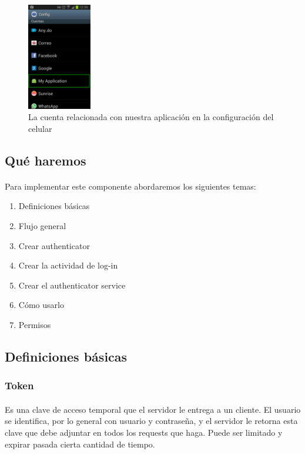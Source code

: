 \documentclass[10pt]{extarticle}
\begin{document}
\begin{figure}[H]
    \centering
    \includegraphics[width=0.25\textwidth]{app_en_accounts_settings.png}
    \caption{La cuenta relacionada con nuestra aplicación en la configuración del celular}
    \label{fig:app_en_accounts_settings}
\end{figure}

\subsection{Qué haremos}

\paragraph{}
Para implementar este componente abordaremos los siguientes temas:

\begin{enumerate}
	\item Definiciones básicas
	\item Flujo general
	\item Crear authenticator
	\item Crear la actividad de log-in
	\item Crear el authenticator service
	\item Cómo usarlo
	\item Permisos
\end{enumerate}


\subsection{Definiciones básicas}

\subsubsection{Token}
\paragraph{}
Es una clave de acceso temporal que el servidor le entrega a un cliente. El usuario se identifica, por lo general con usuario y contraseña, y el servidor le retorna esta clave que debe adjuntar en todos los requests que haga. Puede ser limitado y expirar pasada cierta cantidad de tiempo.
\end{document}

